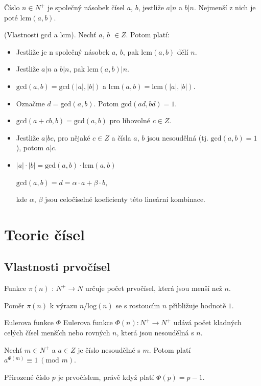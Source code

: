 \documentclass{szzclass}
\begin{document}
Číslo $n \in N^+$ je společný násobek čísel $a$, $b$, jestliže $a|n$ a $b|n$. Nejmenší z nich je poté lcm$(a,b)$.

(Vlastnosti gcd a lcm). Nechť $a$, $b$ $\in Z$. Potom platí:
\begin{itemize}
    \item Jestliže je n společný násobek $a$, $b$, pak $\text{lcm}(a, b)$ dělí $n$.
    \item Jestliže $a|n$ a $b|n$, pak $\text{lcm}(a, b)|n$.
    \item $\text{gcd}(a, b) = \text{gcd}(|a|, |b|)$ a $\text{lcm}(a, b) = \text{lcm}(|a|, |b|)$.
    \item Označme $d = \text{gcd}(a, b)$. Potom $\text{gcd}( a d,bd) = 1$.
    \item $\text{gcd}(a + cb, b) = \text{gcd}(a, b)$ pro libovolné $c \in Z$.
    \item Jestliže $a|bc$, pro nějaké $c \in Z$ a čísla $a$, $b$ jsou nesoudělná (tj. $\text{gcd}(a, b) = 1$), potom $a|c$.
    \item $|a|\cdot|b| = \text{gcd}(a,b) \cdot \text{lcm}(a,b)$
\begin{center}
$\text{gcd}(a, b) = d = \alpha \cdot a + \beta \cdot b$,
\end{center}
kde $\alpha$, $\beta$ jsou celočíselné koeficienty této lineární kombinace.
\end{itemize}

\newpage

\section{Teorie čísel}

\subsection{Vlastnosti prvočísel}
Funkce $π(n)$ : $N^+ \rightarrow N$ určuje počet prvočísel, která jsou menší než $n$.

Poměr $π(n)$ k výrazu $n/\text{log}(n)$ se s rostoucím $n$ přibližuje hodnotě $1$.

Eulerova funkce $\Phi$ Eulerova funkce $\Phi(n) : N^+ \rightarrow N^+$ udává počet
kladných celých čísel menších nebo rovných $n$, která jsou nesoudělná s $n$.

Nechť $m \in N^+$ a $a \in Z$ je číslo nesoudělné s $m$. Potom platí $a^{\Phi(m)} ≡ 1~(\text{mod }m)$.

Přirozené číslo $p$ je prvočíslem, právě když platí $\Phi(p) = p - 1$.
\end{document}
